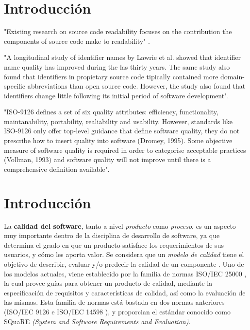 \section{Introducción}

"Existing research on source code readability focuses on the contribution the
components of source code make to readability" \cite{Buse2008}.

"A longitudinal study of identifier names by Lawrie et al. \cite{Lawrie2007} showed that
identifier name quality has improved during the las thirty years. 
The same study also found
that identifiers in propietary source code tipically contained more domain-specific
abbreviations than open source code.
However, the study also found that identifiers change little following its initial period
of software development".

"ISO-9126 defines a set of six quality attributes: efficiency, functionality, maintanability,
portability, realiability and usability.
However, standards like ISO-9126 only offer top-level guidance that define software quality,
they do not prescribe how to insert quality into software (Dromey, 1995).
Some objective measure of software quality is required in order to categorise acceptable
practices (Vollman, 1993) and software quality will not improve until there is a comprehensive
definition available"\cite{Relf04}.

\section{Introducción}

La \textbf{calidad del software}, tanto a nivel \textit{producto} como \textit{proceso}, 
es un aspecto muy importante dentro de la disciplina de desarrollo de software, ya que
determina el grado en que un producto satisface los requerimientos de sus usuarios, y cómo
les aporta valor.
Se considera que un \textit{modelo de calidad} tiene el objetivo de describir, evaluar y/o 
predecir la calidad de un componente \cite{Wagner2013}.
Uno de los modelos actuales, viene establecido por la familia de normas ISO/IEC 25000 \cite{ref}, 
la cual provee guías para obtener un producto de calidad, mediante la especificación 
de requisitos y características de calidad, así como la evaluación de las mismas.
Esta familia de normas está bastada en dos normas anteriores (ISO/IEC 9126 \cite{ref}
e ISO/IEC 14598 \cite{ref}), y proporcian el estándar conocido como SQuaRE 
\textit{(System and Software Requirements and Evaluation)}.

